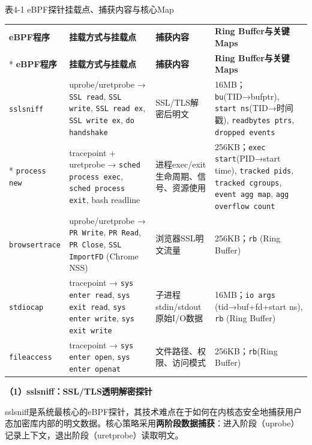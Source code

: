 \documentclass[a4paper]{ctexart}
\makeatletter
\renewcommand{\_}{%
  \ifmmode
    \nfss@text{\textunderscore}%
  \else
    \textunderscore\discretionary{}{}{}%
  \fi}
\makeatother
\begin{document}
\medskip
{\centering\small
表4-1 eBPF探针挂载点、捕获内容与核心Map\par
\vspace{3pt}
\setlength{\tabcolsep}{6pt}
\renewcommand{\arraystretch}{1.1}
\begin{longtable}{p{4.1cm} >{\raggedright\arraybackslash}p{3.5cm} >{\raggedright\arraybackslash}p{3cm} >{\raggedright\arraybackslash}p{4.1cm}}
\hline
\textbf{eBPF程序} & \textbf{挂载方式与挂载点} & \textbf{捕获内容} & \textbf{Ring Buffer与关键Maps} \\*
\hline
\endfirsthead
\hline
\textbf{eBPF程序} & \textbf{挂载方式与挂载点} & \textbf{捕获内容} & \textbf{Ring Buffer与关键Maps} \\
\hline
\endhead
\hline
\endfoot
\hline
\endlastfoot

\texttt{sslsniff} & uprobe/uretprobe → \texttt{SSL\_read}, \texttt{SSL\_write}, \texttt{SSL\_read\_ex}, \texttt{SSL\_write\_ex}, \texttt{do\_handshake} & SSL/TLS解密后明文 & 16MB；\texttt{bu}(TID→bufptr), \texttt{start\_ns}(TID→时间戳), \texttt{readbytes\_ptrs}, \texttt{dropped\_events} \\*
\hline
\texttt{process\_new} & tracepoint + uretprobe → \texttt{sched\_process\_exec}, \texttt{sched\_process\_exit}, bash readline & 进程exec/exit生命周期、信号、资源使用 & 256KB；\texttt{exec\_start}(PID→start\_time), \texttt{tracked\_pids}, \texttt{tracked\_cgroups}, \texttt{event\_agg\_map}, \texttt{agg\_overflow\_count} \\
\hline
\texttt{browsertrace} & uprobe/uretprobe → \texttt{PR\_Write}, \texttt{PR\_Read}, \texttt{PR\_Close}, \texttt{SSL\_ImportFD} (Chrome NSS) & 浏览器SSL明文流量 & 256KB；\texttt{rb} (Ring Buffer) \\
\hline
\texttt{stdiocap} & tracepoint → \texttt{sys\_enter\_read}, \texttt{sys\_exit\_read}, \texttt{sys\_enter\_write}, \texttt{sys\_exit\_write} & 子进程stdin/stdout原始I/O数据 & 16MB；\texttt{io\_args} (tid→buf+fd+start\_ns), \texttt{rb} (Ring Buffer) \\
\hline
\texttt{fileaccess} & tracepoint → \texttt{sys\_enter\_open}, \texttt{sys\_enter\_openat} & 文件路径、权限、访问模式 & 256KB；\texttt{rb}(Ring Buffer) \\
\hline
\end{longtable}
\par}

\textbf{（1）sslsniff：SSL/TLS透明解密探针}


sslsniff是系统最核心的eBPF探针，其技术难点在于如何在内核态安全地捕获用户态加密库内部的明文数据。核心策略采用\textbf{两阶段数据捕获}：进入阶段（uprobe）记录上下文，退出阶段（uretprobe）读取明文。
\end{document}
